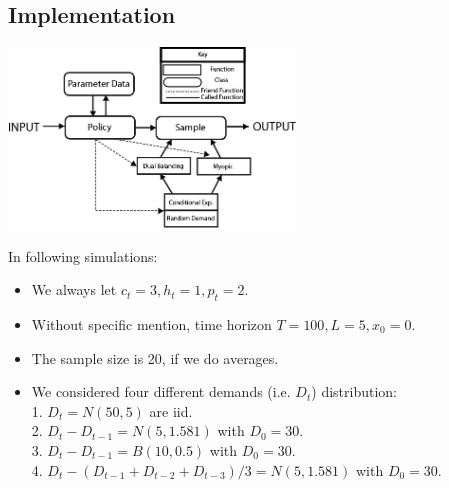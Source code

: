 \documentclass[twoside]{article}
\begin{document}
\begin{multicols}{2}

\section{Implementation}
\begin{center}
  \includegraphics[width=3.0in]{software_diagram.png}
\end{center}

In following simulations:
    \begin{itemize}
      \item We always let $c_t = 3, h_t = 1, p_t = 2$.
      \item Without specific mention, time horizon $T = 100, L = 5, x_0 = 0$.
      \item The sample size is 20, if we do averages.
      \item We considered four different demands (i.e. $D_t$) distribution:\\
            1. $D_t = N(50,5)$ are iid.\\
            2. $D_t-D_{t-1} = N(5,1.581)$ with $D_0=30$.\\
            3. $D_t-D_{t-1} = B(10,0.5)$ with $D_0=30$.\\
            4. $D_t- (D_{t-1} + D_{t-2} + D_{t-3})/3 = N(5,1.581)$ with $D_0=30$.
    \end{itemize}


\end{multicols}
\end{document}

